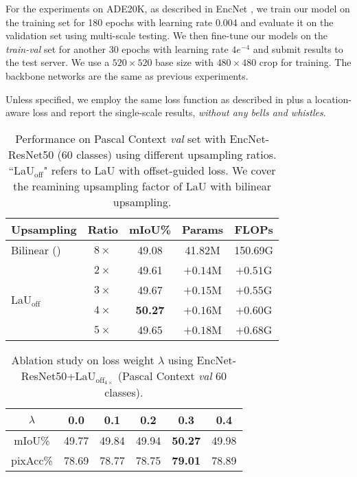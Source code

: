 \documentclass[10pt,twocolumn,letterpaper]{article}
\begin{document}
For the experiments on ADE20K, as described in EncNet \cite{EncNet}, we train our model on the training set for 180 epochs with learning rate 0.004 and evaluate it on the validation set using multi-scale testing. We then fine-tune our models on the \textit{train-val} set for another 30 epochs with learning rate $4e^{-4}$ and submit results to the test server. We use a $520\times520$ base size with $480\times480$ crop for training. The backbone networks are the same as previous experiments.

Unless specified, we employ the same loss function as described in \cite{ASPP, EncNet} plus a location-aware loss and report the single-scale results, \textit{without any bells and whistles}.

\begin{table}[t]
  \caption{Performance on Pascal Context \textit{val} set with EncNet-ResNet50 (60 classes) using different upsampling ratios. ``LaU$_{\text{off}}$" refers to LaU with offset-guided loss. We cover the reamining upsampling factor of LaU with bilinear upsampling.}\label{sample-table}
  \centering
\begin{tabular}{lcccc}
\hline 
    Upsampling     & Ratio     & mIoU\% & Params & FLOPs\\
\hline   
\hline
 Bilinear (\cite{EncNet}) & $8\times$ & 49.08 & 41.82M  & 150.69G\\
\hline 
    \multirow{4}{*}{LaU$_{\text{off}}$} & $2\times$ & 49.61 & $+0.14$M & $+0.51$G\\
    & $3\times$ & 49.67 & $+0.15$M & $+0.55$G\\
    & $4\times$ & \textbf{50.27} & $+0.16$M & $+0.60$G\\
    & $5\times$ & 49.65 & $+0.18$M & $+0.68$G\\
\hline 
  \end{tabular}
\label{diffratio}
\end{table}

\begin{table}[t]
  \caption{Ablation study on loss weight $\lambda$ using EncNet-ResNet50+LaU$_{\text{off}_{4\times}}$ (Pascal Context \textit{val} 60 classes).}\label{sample-table}
  \centering
\begin{tabular}{cccccc}
\hline 
    $\lambda$   & 0.0   & 0.1 & 0.2 & 0.3 & 0.4\\
\hline   
\hline
 mIoU\% & 49.77  & 49.84 & 49.94 & \textbf{50.27} & 49.98 \\
pixAcc\% & 78.69 & 78.77 & 78.75 & \textbf{79.01} & 78.89 \\
\hline 
  \end{tabular}
\label{lambda}
\end{table}
\end{document}

